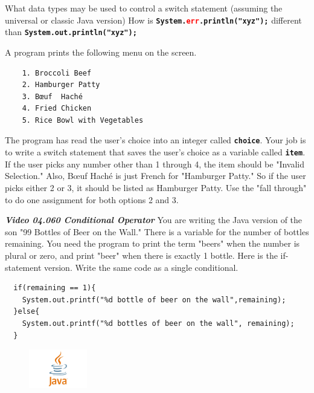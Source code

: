 \documentclass[letterpaper,11pt]{exam}
\newcommand{\videoheading}[1]{\Large\textbf{\textit{#1}}}
\begin{document}
\begin{questions}
\question What data types may be used to control a switch statement (assuming the universal or classic Java version)
\question How is \texttt{\textbf{System.\textcolor{red}{err}.println("xyz");}} different than \texttt{\textbf{System.out.println("xyz");}}
\begin{minipage}{\textwidth}
\question A program prints the following menu on the screen.
\begin{verbatim}
    1. Broccoli Beef
    2. Hamburger Patty
    3. Bœuf  Haché 
    4. Fried Chicken
    5. Rice Bowl with Vegetables
\end{verbatim}
The program has read the user's choice into an integer called \texttt{\textbf{choice}}.  Your job is to write a switch statement that saves the user's choice as a variable called \texttt{\textbf{item}}. If the user picks any number other than 1 through 4, the item should be "Invalid Selection."  Also, Bœuf  Haché is just French for "Hamburger Patty."  So if the user picks either 2 or 3, it should be listed as Hamburger Patty. Use the "fall through" to do one assignment for both options 2 and 3.
\vspace{6cm}
\end{minipage}
\videoheading{Video 04.060 Conditional Operator}
\question You are writing the Java version of the son "99 Bottles of Beer on the Wall."  There is a variable for the number of bottles remaining.  You need the program to print the term "beers" when the number is plural or zero, and print "beer" when there is exactly 1 bottle.  Here is the if-statement version.  Write the same code as a single conditional.
\begin{verbatim}
  if(remaining == 1){
    System.out.printf("%d bottle of beer on the wall",remaining);
  }else{
    System.out.printf("%d bottles of beer on the wall", remaining);
  }
\end{verbatim}
\end{questions}
\begin{figure}[b]\label{end}
	\center
	\includegraphics[width=1in]{java}
\end{figure}
\end{document}
